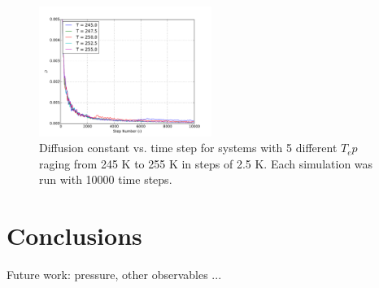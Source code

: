 \documentclass[10pt,showpacs,preprintnumbers,footinbib,amsmath,amssymb,aps,prl,twocolumn,groupedaddress,superscriptaddress,showkeys]{revtex4-1}
\begin{document}
\begin{figure}
\centering
	\includegraphics[width=0.5\textwidth]{figures/meltPlotsLow.pdf}
	\caption{Diffusion constant vs. time step for systems with 5
	different $T_ep$ raging from 245 K to 255 K in steps of 2.5 K. Each
	simulation was run with 10000 time steps.}
	\label{fig:meltPlotsLow}
\end{figure}













\section{Conclusions}

Future work: pressure, other observables ...





\end{document}
